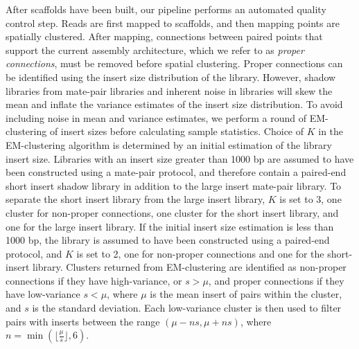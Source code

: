\documentclass{bioinfo}
\begin{document}
After scaffolds have been built, our pipeline performs an automated quality control step.
Reads are first mapped to scaffolds, and then mapping points are spatially clustered. After mapping,
connections between paired points that support the current assembly architecture, which we refer to as 
\emph{proper connections}, must be removed before spatial clustering. Proper connections
can be identified using the insert size distribution of the library. However, shadow libraries from 
mate-pair libraries and inherent noise in libraries will skew the mean and inflate the variance 
estimates of the insert size distribution. To avoid including noise in mean and variance estimates, 
we perform a round of EM-clustering of insert sizes before calculating sample statistics. Choice of $K$ in
the EM-clustering algorithm is determined by an initial estimation of the library insert size. Libraries with an 
insert size greater than 1000 bp are assumed to have been constructed using a mate-pair protocol, and therefore
contain a paired-end short insert shadow library in addition to the large insert mate-pair library. To separate the short insert library
from the large insert library, $K$ is set to 3, one cluster for non-proper connections, one cluster for the short insert
library, and one for the large insert library. If the initial insert size estimation is less than 1000 bp, the library
is assumed to have been constructed using a paired-end protocol, and $K$ is set to 2, one for non-proper connections
and one for the short-insert library. Clusters returned from EM-clustering are identified as non-proper connections if 
they have high-variance, or $s > \mu$, and proper connections if they have low-variance $s < \mu$, where $\mu$ is the mean insert of pairs within
the cluster, and $s$ is the standard deviation. Each low-variance cluster is then used to filter 
pairs with inserts between the range $(\mu-ns,\mu+ns)$, where $n = \min(\lfloor\frac{\mu}{s}\rfloor, 6)$.  
\end{document}
